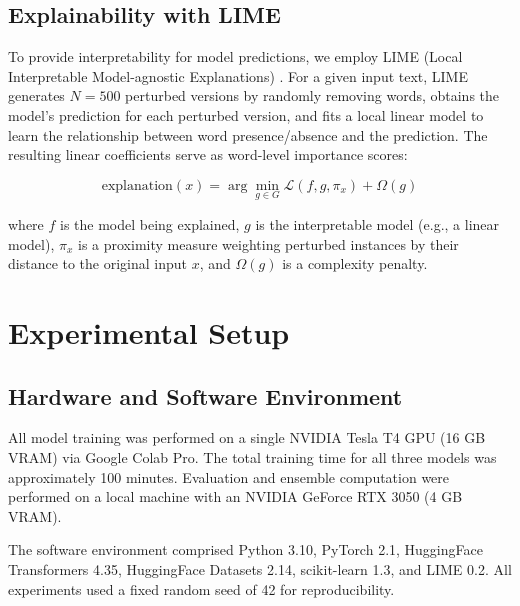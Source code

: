 \documentclass[12pt, a4paper]{article}
\begin{document}
\subsection{Explainability with LIME}

To provide interpretability for model predictions, we employ LIME (Local Interpretable Model-agnostic Explanations) \citep{ribeiro2016lime}. For a given input text, LIME generates $N = 500$ perturbed versions by randomly removing words, obtains the model's prediction for each perturbed version, and fits a local linear model to learn the relationship between word presence/absence and the prediction. The resulting linear coefficients serve as word-level importance scores:

\begin{equation}
\text{explanation}(x) = \arg\min_{g \in G} \mathcal{L}(f, g, \pi_x) + \Omega(g)
\label{eq:lime}
\end{equation}

\noindent where $f$ is the model being explained, $g$ is the interpretable model (e.g., a linear model), $\pi_x$ is a proximity measure weighting perturbed instances by their distance to the original input $x$, and $\Omega(g)$ is a complexity penalty.

\FloatBarrier

\section{Experimental Setup}
\label{sec:setup}

\subsection{Hardware and Software Environment}

All model training was performed on a single NVIDIA Tesla T4 GPU (16 GB VRAM) via Google Colab Pro. The total training time for all three models was approximately 100 minutes. Evaluation and ensemble computation were performed on a local machine with an NVIDIA GeForce RTX 3050 (4 GB VRAM).

The software environment comprised Python 3.10, PyTorch 2.1, HuggingFace Transformers 4.35, HuggingFace Datasets 2.14, scikit-learn 1.3, and LIME 0.2. All experiments used a fixed random seed of 42 for reproducibility.
\end{document}
